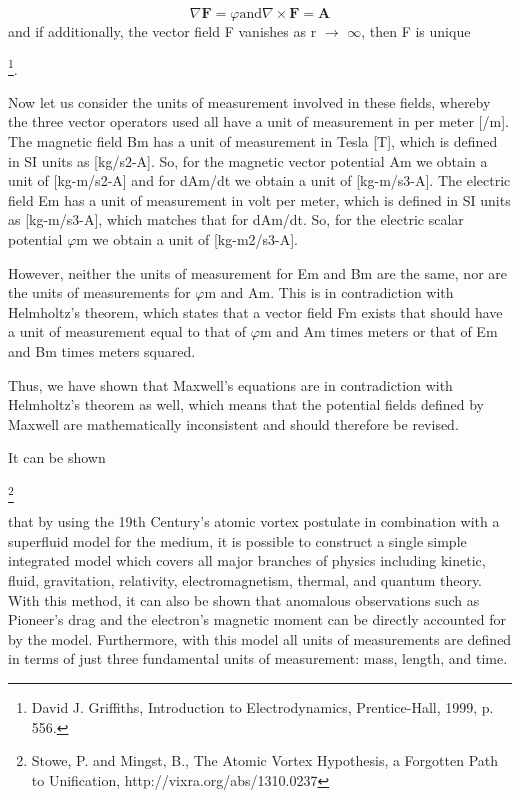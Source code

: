 \documentclass[twoside,final]{article}
\begin{document}
{\begin{equation}
\nabla \boldsymbol F=\varphi \text{and}\nabla \times \boldsymbol F=\boldsymbol A
\end{equation}
and if additionally, the vector field F vanishes as r $\rightarrow $ ${\infty}$,
then F is unique

\footnote{ David J. Griffiths, Introduction to Electrodynamics,
Prentice-Hall, 1999, p. 556.\par }.

Now let us consider the units of measurement involved in these fields, whereby
the three vector operators used all have a unit of measurement in per meter
[/m]. The magnetic field Bm has a unit of measurement in Tesla [T], which is
defined in SI units as [kg/s2{}-A]. So, for the magnetic vector potential Am we
obtain a unit of [kg-m/s2{}-A] and for dAm/dt we obtain a unit of [kg-m/s3{}-A].
The electric field Em has a unit of measurement in volt per meter, which is
defined in SI units as [kg-m/s3{}-A], which matches that for dAm/dt. So, for the
electric scalar potential $\varphi $m we obtain a unit of [kg-m2/s3{}-A].

However, neither the units of measurement for Em and Bm are the same, nor are
the units of measurements for $\varphi $m and Am. This is in contradiction with
Helmholtz's theorem, which states that a vector field Fm exists that should have
a unit of measurement equal to that of $\varphi $m and Am times meters or that
of Em and Bm times meters squared.

Thus, we have shown that Maxwell's equations are in contradiction with
Helmholtz's theorem as well, which means that the potential fields defined by
Maxwell are mathematically inconsistent and should therefore be revised.

It can be shown

\footnote{ Stowe, P. and Mingst, B., The Atomic Vortex Hypothesis, a Forgotten
Path to Unification, http://vixra.org/abs/1310.0237 \par } 

that by using the 19th Century's atomic vortex postulate in combination with a
superfluid model for the medium, it is possible to construct a single simple
integrated model which covers all major branches of physics including kinetic,
fluid, gravitation, relativity, electromagnetism, thermal, and quantum theory.
With this method, it can also be shown that anomalous observations such as
Pioneer's drag and the electron's magnetic moment can be directly accounted for
by the model. Furthermore, with this model all units of measurements are defined
in terms of just three fundamental units of measurement: mass, length, and time. 

}
\end{document}
